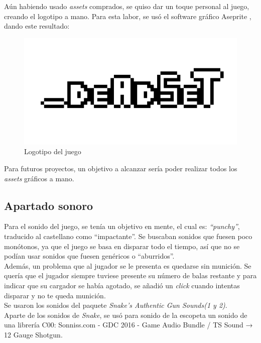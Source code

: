 \documentclass[11pt]{article}
\begin{document}
        Aún habiendo usado \textit{assets} comprados, se quiso dar un toque personal al juego, creando el logotipo a mano. Para esta labor, se usó el software gráfico Aseprite \cite{aseprite}, dando este resultado:
        \begin{figure}[H]
            \centering
            \includegraphics[width=\textwidth]{Images/logo_big.png}
            \caption{Logotipo del juego}
        \end{figure}
        
        Para futuros proyectos, un objetivo a alcanzar sería poder realizar todos los \textit{assets} gráficos a mano.
    
    \subsection{Apartado sonoro}
        
        Para el sonido del juego, se tenía un objetivo en mente, el cual es: \textit{“punchy”}, traducido al castellano como “impactante”. Se buscaban sonidos que fuesen poco monótonos, ya que el juego se basa en disparar todo el tiempo, así que no se podían usar sonidos que fuesen genéricos o “aburridos”.\\

        Además, un problema que al jugador se le presenta es quedarse sin munición. Se quería que el jugador siempre tuviese presente su número de balas restante y para indicar que su cargador se había agotado, se añadió un \textit{click} cuando intentas disparar y no te queda munición.\\
        
        Se usaron los sonidos del paquete \textit{Snake's Authentic Gun Sounds(1 y 2)}.\\
        
        Aparte de los sonidos de \textit{Snake}, se usó para sonido de la escopeta un sonido de una librería C00: Sonniss.com - GDC 2016 - Game Audio Bundle / TS Sound → 12 Gauge Shotgun.\\
        
\end{document}

